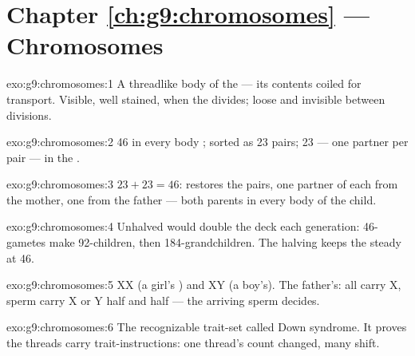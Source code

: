 \section*{Chapter \ref{ch:g9:chromosomes} --- Chromosomes}

\begin{solution}{exo:g9:chromosomes:1}
A threadlike body of the  --- its contents coiled
for transport. Visible, well stained, when the 
divides; loose and invisible between divisions.
\end{solution}

\begin{solution}{exo:g9:chromosomes:2}
46 in every body ; sorted as 23 pairs; 23 --- one
partner per pair --- in the .
\end{solution}

\begin{solution}{exo:g9:chromosomes:3}
$23 + 23 = 46$:  restores the pairs, one
partner of each from the mother, one from the father ---
both parents in every body  of the child.
\end{solution}

\begin{solution}{exo:g9:chromosomes:4}
Unhalved  would double the deck each generation:
46-gametes make 92-children, then 184-grandchildren. The
halving keeps the  steady at 46.
\end{solution}

\begin{solution}{exo:g9:chromosomes:5}
XX (a girl's ) and XY (a boy's). The father's:
 all carry X, sperm carry X or Y half and half --- the
arriving sperm decides.
\end{solution}

\begin{solution}{exo:g9:chromosomes:6}
The recognizable trait-set called Down syndrome. It proves
the threads carry trait-instructions: one thread's count
changed, many  shift.
\end{solution}

